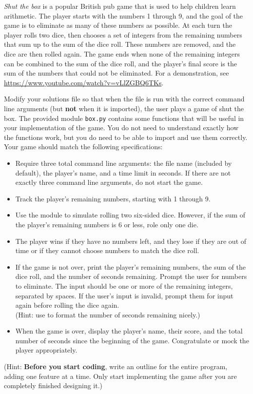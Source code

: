 \begin{problem} %
\emph{Shut the box} is a popular British pub game that is used to help children learn arithmetic.
The player starts with the numbers 1 through 9, and the goal of the game is to eliminate as many of these numbers as possible.
At each turn the player rolls two dice, then chooses a set of integers from the remaining numbers that sum up to the sum of the dice roll.
These numbers are removed, and the dice are then rolled again.
The game ends when none of the remaining integers can be combined to the sum of the dice roll, and the player's final score is the sum of the numbers that could not be eliminated.
For a demonstration, see \url{https://www.youtube.com/watch?v=vLlZGBQ6TKs}.

Modify your solutions file so that when the file is run with the correct command line arguments (but \textbf{not} when it is imported), the user plays a game of shut the box.
The provided module \texttt{box.py} contains some functions that will be useful in your implementation of the game.
You do not need to understand exactly how the functions work, but you do need to be able to import and use them correctly.
Your game should match the following specifications:

\begin{itemize}
\item Require three total command line arguments: the file name (included by default), the player's name, and a time limit in seconds.
If there are not exactly three command line arguments, do not start the game.
\item Track the player's remaining numbers, starting with 1 through 9.
\item Use the  module to simulate rolling two six-sided dice.
However, if the sum of the player's remaining numbers is 6 or less, role only one die.
\item The player wins if they have no numbers left, and they lose if they are out of time or if they cannot choose numbers to match the dice roll.
\item If the game is not over, print the player's remaining numbers, the sum of the dice roll, and the number of seconds remaining.
Prompt the user for numbers to eliminate.
The input should be one or more of the remaining integers, separated by spaces.
If the user's input is invalid, prompt them for input again before rolling the dice again.
\\(Hint: use  to format the number of seconds remaining nicely.)
\item When the game is over, display the player's name, their score, and the total number of seconds since the beginning of the game.
Congratulate or mock the player appropriately.
\end{itemize}
(Hint: \textbf{Before you start coding}, write an outline for the entire program, adding one feature at a time.
Only start implementing the game after you are completely finished designing it.)


\end{problem}
